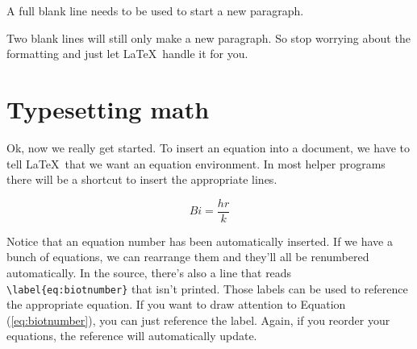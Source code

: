 \documentclass[12pt,a4paper]{article}
\begin{document}
  A full blank line needs to be used to start a new paragraph.  


  Two blank lines will still only make a new paragraph. So stop worrying
  about the formatting and just let \LaTeX\ handle it for you.  

\section{Typesetting math}
  Ok, now we really get started.  To insert an equation into a document,
  we have to tell \LaTeX\ that we want an equation environment.  In most
  helper programs there will be a shortcut to insert the appropriate
  lines.  

  \begin{equation}
    Bi = \frac{hr}{k}
    \label{eq:biotnumber}
  \end{equation}

  Notice that an equation number has been automatically inserted.  If we
  have a bunch of equations, we can rearrange them and they'll all be
  renumbered automatically.  In the source, there's also a line that
  reads \verb|\label{eq:biotnumber}| that isn't printed.  Those labels
  can be used to reference the appropriate equation.  If you want to
  draw attention to Equation (\ref{eq:biotnumber}), you can just
  reference the label.  Again, if you reorder your equations, the
  reference will automatically update.  
\end{document}
